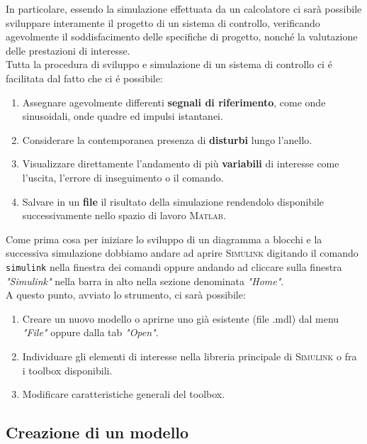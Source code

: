 \documentclass[../main.tex]{subfiles}
\begin{document}
In particolare, essendo la simulazione effettuata da un calcolatore ci sarà possibile sviluppare interamente il progetto di un sistema di controllo, verificando agevolmente il soddisfacimento delle specifiche di progetto, nonché la valutazione delle prestazioni di interesse.\\

Tutta la procedura di sviluppo e simulazione di un sistema di controllo ci é facilitata dal fatto che ci é possibile:

\begin{enumerate}
	\item[\textbf{-}] Assegnare agevolmente differenti \textbf{segnali di riferimento}, come onde sinusoidali, onde quadre ed impulsi istantanei.
	\item[\textbf{-}] Considerare la contemporanea presenza di \textbf{disturbi} lungo l'anello.
	\item[\textbf{-}] Visualizzare direttamente l'andamento di più \textbf{variabili} di interesse come l'uscita, l'errore di inseguimento o il comando.
	\item[\textbf{-}] Salvare in un \textbf{file} il risultato della simulazione rendendolo disponibile successivamente nello spazio di lavoro \textsc{Matlab}.
\end{enumerate}

Come prima cosa per iniziare lo sviluppo di un diagramma a blocchi e la successiva simulazione dobbiamo andare ad aprire \textsc{Simulink} digitando il comando \texttt{simulink} nella finestra dei comandi oppure andando ad cliccare sulla finestra \textit{"Simulink"} nella barra in alto nella sezione denominata \textit{"Home"}.\\



A questo punto, avviato lo strumento, ci sarà possibile:

\begin{enumerate}
	\item[\textbf{-}] Creare un nuovo modello o aprirne uno già esistente (file .mdl) dal menu \textit{"File"} oppure dalla tab \textit{"Open"}.
	\item[\textbf{-}] Individuare gli elementi di interesse nella libreria principale di \textsc{Simulink} o fra i toolbox disponibili.
	\item[\textbf{-}] Modificare caratteristiche generali del toolbox.
\end{enumerate}


\subsection{Creazione di un modello}
\end{document}
